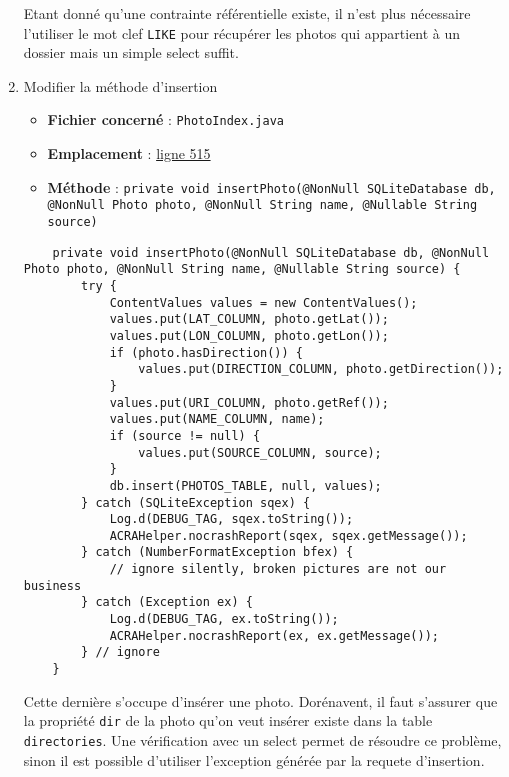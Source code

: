 \begin{enumerate}
    Etant donné qu'une contrainte référentielle existe, il n'est plus nécessaire l'utiliser le mot clef \texttt{LIKE} pour récupérer les photos qui appartient à un dossier mais un simple select suffit.

    \item Modifier la méthode d'insertion
    \begin{itemize}
        \item \textbf{Fichier concerné} : \texttt{PhotoIndex.java}
        \item \textbf{Emplacement} : \href{https://github.com/MarcusWolschon/osmeditor4android/blob/127fb689ad42c77558e4512e14de754e0561cd27/src/main/java/de/blau/android/photos/PhotoIndex.java#L515}{ligne 515}
        \item \textbf{Méthode} : \texttt{private void insertPhoto(@NonNull SQLiteDatabase db, @NonNull Photo photo, @NonNull String name, @Nullable String source)}
    \end{itemize}

    \begin{verbatim}
    private void insertPhoto(@NonNull SQLiteDatabase db, @NonNull Photo photo, @NonNull String name, @Nullable String source) {
        try {
            ContentValues values = new ContentValues();
            values.put(LAT_COLUMN, photo.getLat());
            values.put(LON_COLUMN, photo.getLon());
            if (photo.hasDirection()) {
                values.put(DIRECTION_COLUMN, photo.getDirection());
            }
            values.put(URI_COLUMN, photo.getRef());
            values.put(NAME_COLUMN, name);
            if (source != null) {
                values.put(SOURCE_COLUMN, source);
            }
            db.insert(PHOTOS_TABLE, null, values);
        } catch (SQLiteException sqex) {
            Log.d(DEBUG_TAG, sqex.toString());
            ACRAHelper.nocrashReport(sqex, sqex.getMessage());
        } catch (NumberFormatException bfex) {
            // ignore silently, broken pictures are not our business
        } catch (Exception ex) {
            Log.d(DEBUG_TAG, ex.toString());
            ACRAHelper.nocrashReport(ex, ex.getMessage());
        } // ignore
    }
    \end{verbatim}

    Cette dernière s'occupe d'insérer une photo. Dorénavent, il faut s'assurer que la propriété \texttt{dir} de la photo qu'on veut insérer existe dans la table \texttt{directories}.
    Une vérification avec un select permet de résoudre ce problème, sinon il est possible d'utiliser l'exception générée par la requete d'insertion.


\end{enumerate}

